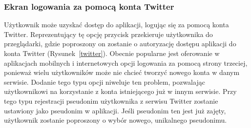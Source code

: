        \subsubsection{Ekran logowania za pomocą konta Twitter}
        Użytkownik może uzyskać dostęp do aplikacji, logując się za pomocą konta Twitter. Reprezentujący tę opcję przycisk przekieruje użytkownika do przeglądarki, gdzie poproszony on zostanie o autoryzację
        dostępu aplikacji do konta Twitter (Rysunek~\ref{twitter}). Obecnie popularne jest oferowanie w aplikacjach mobilnych i internetowych opcji logowania za pomocą strony trzeciej, ponieważ
        wielu użytkowników może nie chcieć tworzyć nowego konta w danym serwisie. Dodanie tego typu opcji niweluje ten problem, pozwalając użytkownikowi na korzystanie z konta istniejącego już w
        innym serwisie. Przy tego typu rejestracji pseudonim użytkownika z serwisu Twitter zostanie ustawiony jako pseudonim w aplikacji. Jeśli pseudonim ten jest już zajęty,  użytkownik zostanie
        poproszony o wybór nowego, unikalnego pseudonimu.

